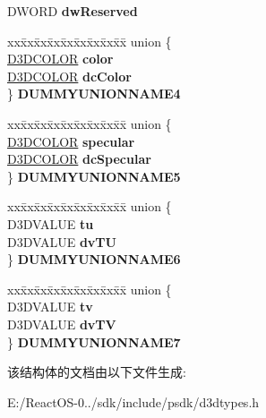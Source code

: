 \begin{DoxyCompactItemize}
\begin{tabbing}
\end{tabbing}\item 
\mbox{\label{struct___d3_d_l_v_e_r_t_e_x_acdb6594a3cc60485a5621554ec065180}} 
D\+W\+O\+RD {\bfseries dw\+Reserved}
\item 
\mbox{\label{struct___d3_d_l_v_e_r_t_e_x_a2346c510f43f36f7985346b33796c381}} 
\begin{tabbing}
xx\=xx\=xx\=xx\=xx\=xx\=xx\=xx\=xx\=\kill
union \{\\
\>\hyperlink{struct_d3_d_c_o_l_o_r}{D3DCOLOR} {\bfseries color}\\
\>\hyperlink{struct_d3_d_c_o_l_o_r}{D3DCOLOR} {\bfseries dcColor}\\
\} {\bfseries DUMMYUNIONNAME4}\\

\end{tabbing}\item 
\mbox{\label{struct___d3_d_l_v_e_r_t_e_x_aac732eeded983255eeee91b572c8158f}} 
\begin{tabbing}
xx\=xx\=xx\=xx\=xx\=xx\=xx\=xx\=xx\=\kill
union \{\\
\>\hyperlink{struct_d3_d_c_o_l_o_r}{D3DCOLOR} {\bfseries specular}\\
\>\hyperlink{struct_d3_d_c_o_l_o_r}{D3DCOLOR} {\bfseries dcSpecular}\\
\} {\bfseries DUMMYUNIONNAME5}\\

\end{tabbing}\item 
\mbox{\label{struct___d3_d_l_v_e_r_t_e_x_a8a199a780fb5ab6a46959928a4630dbd}} 
\begin{tabbing}
xx\=xx\=xx\=xx\=xx\=xx\=xx\=xx\=xx\=\kill
union \{\\
\>D3DVALUE {\bfseries tu}\\
\>D3DVALUE {\bfseries dvTU}\\
\} {\bfseries DUMMYUNIONNAME6}\\

\end{tabbing}\item 
\mbox{\label{struct___d3_d_l_v_e_r_t_e_x_a34412653049934a79781651219b78a76}} 
\begin{tabbing}
xx\=xx\=xx\=xx\=xx\=xx\=xx\=xx\=xx\=\kill
union \{\\
\>D3DVALUE {\bfseries tv}\\
\>D3DVALUE {\bfseries dvTV}\\
\} {\bfseries DUMMYUNIONNAME7}\\

\end{tabbing}\end{DoxyCompactItemize}


该结构体的文档由以下文件生成\+:\begin{DoxyCompactItemize}
\item 
E\+:/\+React\+O\+S-\/0../sdk/include/psdk/d3dtypes.\+h\end{DoxyCompactItemize}
